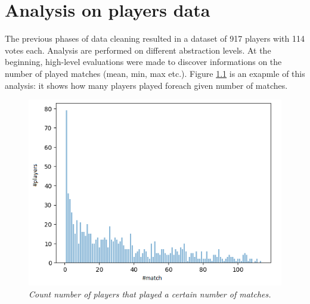 \chapter {Analysis on players data}
The previous phases of data cleaning resulted in a dataset of 917 players with 114 votes each.
Analysis are performed on different abstraction levels.
At the beginning, high-level evaluations were made to discover informations on the number of played matches  (mean, min, max etc.). Figure \ref{fig:countMatch} is an exapmle of this analysis: it shows how many players played foreach given number of matches.
\\
\begin{figure}[H]
  \includegraphics[scale=0.7]{images/img-01.png}
    \centering
   \caption{\textit{Count number of players that played a certain number of matches.}}
  \label{fig:countMatch}
\end{figure}

